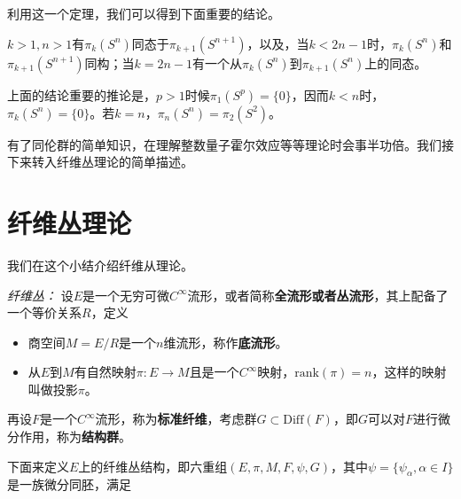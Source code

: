 \documentclass[supercite]{HustGraduPaper}
\begin{document}
\begin{appendices}
		利用这一个定理，我们可以得到下面重要的结论。
		
		$k>1, n>1$有$\pi_k(S^n)$同态于$\pi_{k+1}(S^{n+1})$，以及，当$k<2n-1$时，$\pi_k(S^n)$和$\pi_{k+1}(S^{n+1})$同构；当$k = 2n-1$有一个从$\pi_k(S^n)$到$\pi_{k+1}(S^n)$上的同态。
		
		上面的结论重要的推论是，$p>1$时候$\pi_1(S^p) = \{0\}$，因而$k<n$时，$\pi_k(S^n) = \{0\}$。若$k = n$，$\pi_n(S^n) = \pi_2(S^2)$。
		
		有了同伦群的简单知识，在理解整数量子霍尔效应等等理论时会事半功倍。我们接下来转入纤维丛理论的简单描述。
		
		
		\section{纤维丛理论\label{appendix: fibre}} 
		我们在这个小结介绍纤维从理论。
		
		\textit{纤维丛：} 设$E$是一个无穷可微$C^\infty$流形，或者简称\textbf{全流形或者丛流形}，其上配备了一个等价关系$R$，定义
		\begin{itemize}
			\item 商空间$M = E/R$是一个$n$维流形，称作\textbf{底流形}。
			\item 从$E$到$M$有自然映射$\pi: E\to M$且是一个$C^\infty$映射，$\text{rank}(\pi) = n$，这样的映射叫做投影$\pi$。
		\end{itemize}
		
		再设$F$是一个$C^\infty$流形，称为\textbf{标准纤维}，考虑群$G \subset \text{Diff}(F)$，即$G$可以对$F$进行微分作用，称为\textbf{结构群}。
		
		下面来定义$E$上的纤维丛结构，即六重组$(E,\pi,M,F,\psi,G)$，其中$\psi = \{\psi_\alpha,\alpha \in I\}$是一族微分同胚，满足
		

\end{appendices}
\end{document}
